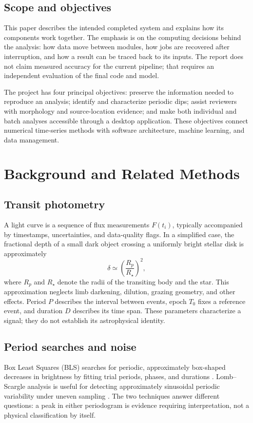 \documentclass[11pt,a4paper]{article}
\begin{document}
\subsection{Scope and objectives}
This paper describes the intended completed system and explains how its components work together. The emphasis is on the computing decisions behind the analysis: how data move between modules, how jobs are recovered after interruption, and how a result can be traced back to its inputs. The report does not claim measured accuracy for the current pipeline; that requires an independent evaluation of the final code and model.

The project has four principal objectives: preserve the information needed to reproduce an analysis; identify and characterize periodic dips; assist reviewers with morphology and source-location evidence; and make both individual and batch analyses accessible through a desktop application. These objectives connect numerical time-series methods with software architecture, machine learning, and data management.

\section{Background and Related Methods}
\subsection{Transit photometry}
A light curve is a sequence of flux measurements $F(t_i)$, typically accompanied by timestamps, uncertainties, and data-quality flags. In a simplified case, the fractional depth of a small dark object crossing a uniformly bright stellar disk is approximately
\begin{equation}
\delta \simeq \left(\frac{R_p}{R_\star}\right)^2,
\end{equation}
where $R_p$ and $R_\star$ denote the radii of the transiting body and the star. This approximation neglects limb darkening, dilution, grazing geometry, and other effects. Period $P$ describes the interval between events, epoch $T_0$ fixes a reference event, and duration $D$ describes its time span. These parameters characterize a signal; they do not establish its astrophysical identity.

\subsection{Period searches and noise}
Box Least Squares (BLS) searches for periodic, approximately box-shaped decreases in brightness by fitting trial periods, phases, and durations \cite{kovacs}. Lomb--Scargle analysis is useful for detecting approximately sinusoidal periodic variability under uneven sampling \cite{lomb,scargle}. The two techniques answer different questions: a peak in either periodogram is evidence requiring interpretation, not a physical classification by itself.
\end{document}
